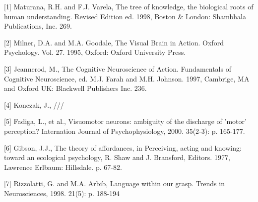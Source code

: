 [1]
Maturana, R.H. and F.J. Varela, 
The tree of knowledge, the biological roots of human understanding. 
Revised Edition ed. 1998, Boston & London: Shambhala Publications, Inc. 269.

[2]
Milner, D.A. and M.A. Goodale, 
The Visual Brain in Action. Oxford Psychology. Vol. 27. 1995, 
Oxford: Oxford University Press.

[3]
Jeannerod, M., 
The Cognitive Neuroscience of Action. Fundamentals of Cognitive Neuroscience, 
ed. M.J. Farah and M.H. Johnson. 1997, Cambrige, MA and Oxford UK: 
Blackwell Publishers Inc. 236.

[4]
Konczak, J.,
///

[5]
Fadiga, L., et al., Visuomotor neurons: ambiguity of the discharge of 
'motor' perception? Internation Journal of Psychophysiology, 2000. 35(2-3): p. 165-177.

[6]
Gibson, J.J., 
The theory of affordances, in Perceiving, acting and knowing: toward an 
ecological psychology, R. Shaw and J. Bransford, Editors. 1977, 
Lawrence Erlbaum: Hillsdale. p. 67-82.

[7]
Rizzolatti, G. and M.A. Arbib, 
Language within our grasp. Trends in Neurosciences, 1998. 21(5): p. 188-194


\fi